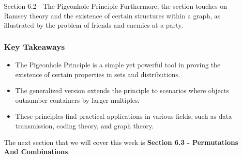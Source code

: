 \begin{notes}{Section 6.2 - The Pigeonhole Principle}
    Furthermore, the section touches on Ramsey theory and the existence of certain structures within a graph, as illustrated by the problem of friends and enemies at a party. \vspace*{1em}
    
    \subsubsection*{Key Takeaways}
    \begin{itemize}
        \item The Pigeonhole Principle is a simple yet powerful tool in proving the existence of certain properties in sets and distributions.
        \item The generalized version extends the principle to scenarios where objects outnumber containers by larger multiples.
        \item These principles find practical applications in various fields, such as data transmission, coding theory, and graph theory.
    \end{itemize}
\end{notes}

The next section that we will cover this week is \textbf{Section 6.3 - Permutations And Combinations}.

